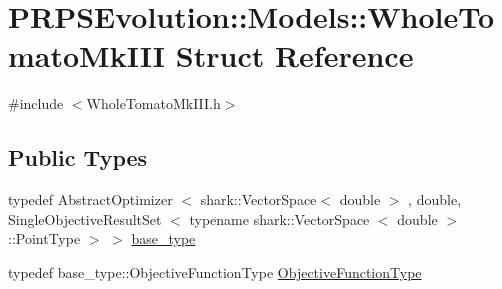 \hypertarget{struct_p_r_p_s_evolution_1_1_models_1_1_whole_tomato_mk_i_i_i}{\section{\-P\-R\-P\-S\-Evolution\-:\-:\-Models\-:\-:\-Whole\-Tomato\-Mk\-I\-I\-I \-Struct \-Reference}
\label{struct_p_r_p_s_evolution_1_1_models_1_1_whole_tomato_mk_i_i_i}
}


{\ttfamily \#include $<$\-Whole\-Tomato\-Mk\-I\-I\-I.\-h$>$}

\subsection*{\-Public \-Types}
\begin{DoxyCompactItemize}
\item 
typedef \-Abstract\-Optimizer\*
$<$ shark\-::\-Vector\-Space$<$ double $>$\*
, double, \*
\-Single\-Objective\-Result\-Set\*
$<$ typename shark\-::\-Vector\-Space\*
$<$ double $>$\-::\-Point\-Type $>$ $>$ \hyperlink{struct_p_r_p_s_evolution_1_1_models_1_1_whole_tomato_mk_i_i_i_af8af1233b8b6856f203b8221e7bf8c17}{base\-\_\-type}
\item 
typedef \*
base\-\_\-type\-::\-Objective\-Function\-Type \hyperlink{struct_p_r_p_s_evolution_1_1_models_1_1_whole_tomato_mk_i_i_i_a6e749ad14992120fc55c0064c508ca88}{\-Objective\-Function\-Type}
\end{DoxyCompactItemize}
